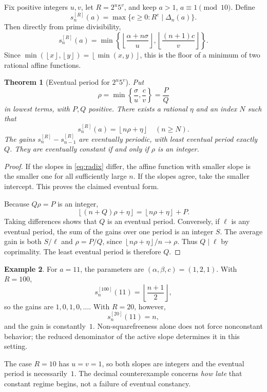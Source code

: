 \documentclass[11pt,a4paper]{article}
\newtheorem{theorem}{Theorem}[section]
\theoremstyle{definition}
\newtheorem{example}[theorem]{Example}
\theoremstyle{remark}
\newcommand{\floor}[1]{\left\lfloor #1\right\rfloor}
\begin{document}
Fix positive integers $u,v$, let $R=2^u5^v$, and keep $a>1$, $a\equiv1\pmod{10}$. Define
\[
 s_n^{[R]}(a)=\max\{e\ge0:R^e\mid\Delta_n(a)\}.
\]
Then directly from prime divisibility,
\begin{equation}\label{eq:radix}
 s_n^{[R]}(a)=
 \min\left\{\floor{\frac{\alpha+n\sigma}{u}},
              \floor{\frac{(n+1)c}{v}}\right\}.
\end{equation}
Since $\min(\floor{x},\floor{y})=\floor{\min(x,y)}$, this is the floor of a minimum of two rational affine functions.

\begin{theorem}[Eventual period for $2^u5^v$]\label{thm:period}
Put
\[
 \rho=\min\left\{\frac\sigma u,\frac cv\right\}=\frac PQ
\]
in lowest terms, with $P,Q$ positive. There exists a rational $\eta$ and an index $N$ such that
\[
 s_n^{[R]}(a)=\floor{n\rho+\eta}\quad(n\ge N).
\]
The gains $s_n^{[R]}-s_{n-1}^{[R]}$ are eventually periodic, with least eventual period exactly $Q$. They are eventually constant if and only if $\rho$ is an integer.
\end{theorem}
\begin{proof}
If the slopes in \eqref{eq:radix} differ, the affine function with smaller slope is the smaller one for all sufficiently large $n$. If the slopes agree, take the smaller intercept. This proves the claimed eventual form.

Because $Q\rho=P$ is an integer,
\[
 \floor{(n+Q)\rho+\eta}=\floor{n\rho+\eta}+P.
\]
Taking differences shows that $Q$ is an eventual period. Conversely, if $\ell$ is any eventual period, the sum of the gains over one period is an integer $S$. The average gain is both $S/\ell$ and $\rho=P/Q$, since $\floor{n\rho+\eta}/n\to\rho$. Thus $Q\mid\ell$ by coprimality. The least eventual period is therefore $Q$.
\end{proof}

\begin{example}
For $a=11$, the parameters are $(\alpha,\beta,c)=(1,2,1)$. With $R=100$,
\[
 s_n^{[100]}(11)=\floor{\frac{n+1}{2}},
\]
so the gains are $1,0,1,0,\ldots$. With $R=20$, however,
\[
 s_n^{[20]}(11)=n,
\]
and the gain is constantly~$1$. Non-squarefreeness alone does not force nonconstant behavior; the reduced denominator of the active slope determines it in this setting.
\end{example}

The case $R=10$ has $u=v=1$, so both slopes are integers and the eventual period is necessarily~$1$. The decimal counterexample concerns \emph{how late} that constant regime begins, not a failure of eventual constancy.
\end{document}
